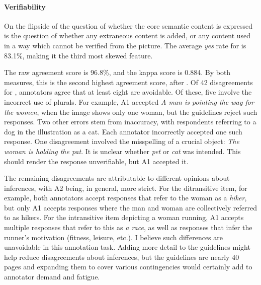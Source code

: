 \paragraph{Verifiability} On the flipside of the question of whether the core semantic content is expressed is the question of whether any extraneous content is added, or any content used in a way which cannot be verified from the picture.  The average \textit{yes} rate for  is 83.1\%, making it the third most skewed feature.

The raw agreement score is 96.8\%, and the kappa score is 0.884. By both measures, this is the second highest agreement score, after . Of 42 disagreements for , annotators agree that at least eight are avoidable. Of these, five involve the incorrect use of plurals. For example, A1 accepted \textit{A man is pointing the way for the women}, when the image shows only one woman, but the guidelines reject such responses. Two other errors stem from inaccuracy, with respondents referring to a dog in the illustration as a cat. Each annotator incorrectly accepted one such response. One disagreement involved the misspelling of a crucial object: \textit{The woman is holding the pat}. It is unclear whether \textit{pet} or \textit{cat} was intended. This should render the response unverifiable, but A1 accepted it.

The remaining disagreements are attributable to different opinions about inferences, with A2 being, in general, more strict.  For the ditransitive item, for example, both annotators accept responses that refer to the woman as a \textit{hiker}, but only A1 accepts responses where the man and woman are collectively referred to as hikers. For the intransitive item depicting a woman running, A1 accepts multiple responses that refer to this as \textit{a race}, as well as responses that infer the runner's motivation (fitness, leisure, etc.). I believe such differences are unavoidable in this annotation task. Adding more detail to the guidelines might help reduce disagreements about inferences, but the guidelines are nearly 40 pages and expanding them to cover various contingencies would certainly add to annotator demand and fatigue.

